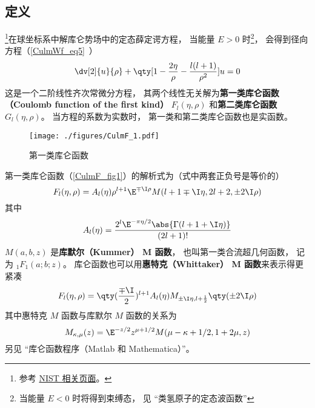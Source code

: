 

\subsection{定义}
\footnote{参考 \href{https://dlmf.nist.gov/33.2}{NIST 相关页面}。}在球坐标系中解库仑势场中的定态薛定谔方程， 当能量 $E > 0$ 时\footnote{当能量 $E < 0$ 时将得到束缚态， 见 “类氢原子的定态波函数”}， 会得到径向方程（\autoref{CulmWf_eq5}~）
\begin{equation}
\dv[2]{u}{\rho} + \qty[1 - \frac{2\eta}{\rho} - \frac{l(l+1)}{\rho^2}]u = 0
\end{equation}
这是一个二阶线性齐次常微分方程， 其两个线性无关解为\textbf{第一类库仑函数（Coulomb function of the first kind）} $F_l(\eta, \rho)$ 和\textbf{第二类库仑函数} $G_l(\eta, \rho)$。 当方程的系数为实数时， 第一类和第二类库仑函数也是实函数。

\begin{figure}[ht]
\centering
\texttt{[image: ./figures/CulmF\_1.pdf]}
\caption{第一类库仑函数} \label{CulmF_fig1}
\end{figure}

第一类库仑函数（\autoref{CulmF_fig1}）的解析式为（式中两套正负号是等价的）
\begin{equation}\label{CulmF_eq1}
F_l(\eta, \rho) = A_l(\eta) \rho^{l+1} \E^{\mp\I\rho} M(l+1\mp\I\eta, 2l+2, \pm 2\I\rho)
\end{equation}
其中
\begin{equation}
A_l(\eta) = \frac{2^l \E^{-\pi\eta/2} \abs{\Gamma(l+1+\I\eta)}}{(2l+1)!}
\end{equation}
$M(a, b, z)$ 是\textbf{库默尔（Kummer） M 函数}， 也叫第一类合流超几何函数， 记为 $_1 F_1(a;b;z)$。 库仑函数也可以用\textbf{惠特克（Whittaker） M 函数}来表示得更紧凑
\begin{equation}\label{CulmF_eq2}
F_l(\eta, \rho) = \qty(\frac{\mp\I}{2})^{l+1} A_l(\eta) M_{\pm\I\eta, l+\frac12}\qty(\pm 2\I\rho)
\end{equation}
其中惠特克 $M$ 函数与库默尔 $M$ 函数的关系为
\begin{equation}
M_{\kappa, \mu}(z) = \E^{-z/2} z^{\mu + 1/2} M(\mu - \kappa + 1/2, 1 + 2\mu, z)
\end{equation}
另见 “库仑函数程序（Matlab 和 Mathematica）”。

